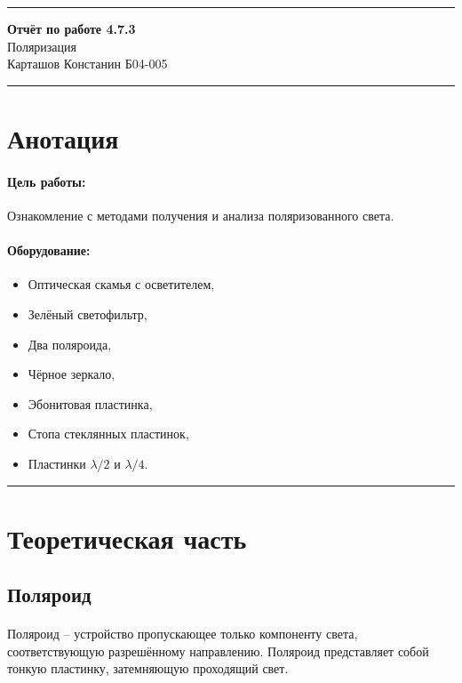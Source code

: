 \documentclass[a4paper,12pt]{article} %
\begin{document}


\hrule 	
\medskip
\begin{raggedright}
{\large \textbf{Отчёт по работе 4.7.3}}
\\
\medskip
{\Large Поляризация} 
\\
\medskip
{\large Карташов Констанин Б04-005}
\medskip
\hrule
\medskip
\end{raggedright}


\section{Анотация}

\paragraph{Цель работы:} 
Ознакомление с методами получения и анализа поляризованного света.

\paragraph{Оборудование:}
\begin{itemize}
\renewcommand{\labelitemi}{$\triangleright$}
\itemsep0em
\item Оптическая скамья с осветителем,
\item Зелёный светофильтр,	
\item Два поляроида,
\item Чёрное зеркало,
\item Эбонитовая пластинка,
\item Стопа стеклянных пластинок,
\item Пластинки $\lambda/2$ и $\lambda/4$.
\end{itemize}


\medskip\hrule\medskip

\section{Теоретическая часть}

\subsection{Поляроид}

\paragraph{} Поляроид -- устройство пропускающее только компоненту света, соответствующую разрешённому направлению. Поляроид представляет собой тонкую пластинку, затемняющую проходящий свет.
\end{document}
